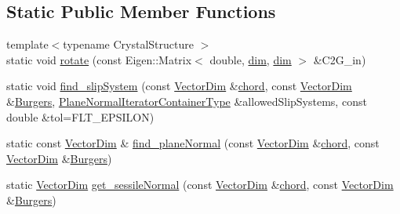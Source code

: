 \subsection*{Static Public Member Functions}
\begin{DoxyCompactItemize}
\item 
{\footnotesize template$<$typename Crystal\+Structure $>$ }\\static void \hyperlink{classmodel_1_1_crystal_orientation_a0f0d28abaae7ebb3ae1444a16ac2e61d}{rotate} (const Eigen\+::\+Matrix$<$ double, \hyperlink{plot_nd_a_8m_a382f3ca768b275b8d563604f7fc7df73}{dim}, \hyperlink{plot_nd_a_8m_a382f3ca768b275b8d563604f7fc7df73}{dim} $>$ \&C2\+G\+\_\+in)
\item 
static void \hyperlink{classmodel_1_1_crystal_orientation_ace2ff43ad7650f46e6cfaa516a558b79}{find\+\_\+slip\+System} (const \hyperlink{classmodel_1_1_crystal_orientation_a32108cd454d481e0e57a0d2801d2adaa}{Vector\+Dim} \&\hyperlink{_spline_segment_base__common_8h_a556bf76f1989429dc61af440056d6b1f}{chord}, const \hyperlink{classmodel_1_1_crystal_orientation_a32108cd454d481e0e57a0d2801d2adaa}{Vector\+Dim} \&\hyperlink{plot_stress_strain_8m_a36fbb0705e1171e0c60fcc8f4927daef}{Burgers}, \hyperlink{classmodel_1_1_crystal_orientation_a48e93a01771bebe12e6f6be1f728cd39}{Plane\+Normal\+Iterator\+Container\+Type} \&allowed\+Slip\+Systems, const double \&tol=F\+L\+T\+\_\+\+E\+P\+S\+I\+L\+O\+N)
\item 
static const \hyperlink{classmodel_1_1_crystal_orientation_a32108cd454d481e0e57a0d2801d2adaa}{Vector\+Dim} \& \hyperlink{classmodel_1_1_crystal_orientation_a3fed3bd80ad4a42478e4889a7c445773}{find\+\_\+plane\+Normal} (const \hyperlink{classmodel_1_1_crystal_orientation_a32108cd454d481e0e57a0d2801d2adaa}{Vector\+Dim} \&\hyperlink{_spline_segment_base__common_8h_a556bf76f1989429dc61af440056d6b1f}{chord}, const \hyperlink{classmodel_1_1_crystal_orientation_a32108cd454d481e0e57a0d2801d2adaa}{Vector\+Dim} \&\hyperlink{plot_stress_strain_8m_a36fbb0705e1171e0c60fcc8f4927daef}{Burgers})
\item 
static \hyperlink{classmodel_1_1_crystal_orientation_a32108cd454d481e0e57a0d2801d2adaa}{Vector\+Dim} \hyperlink{classmodel_1_1_crystal_orientation_a44b43fb6eb877ae22050e29d1070ccda}{get\+\_\+sessile\+Normal} (const \hyperlink{classmodel_1_1_crystal_orientation_a32108cd454d481e0e57a0d2801d2adaa}{Vector\+Dim} \&\hyperlink{_spline_segment_base__common_8h_a556bf76f1989429dc61af440056d6b1f}{chord}, const \hyperlink{classmodel_1_1_crystal_orientation_a32108cd454d481e0e57a0d2801d2adaa}{Vector\+Dim} \&\hyperlink{plot_stress_strain_8m_a36fbb0705e1171e0c60fcc8f4927daef}{Burgers})

\end{DoxyCompactItemize}
